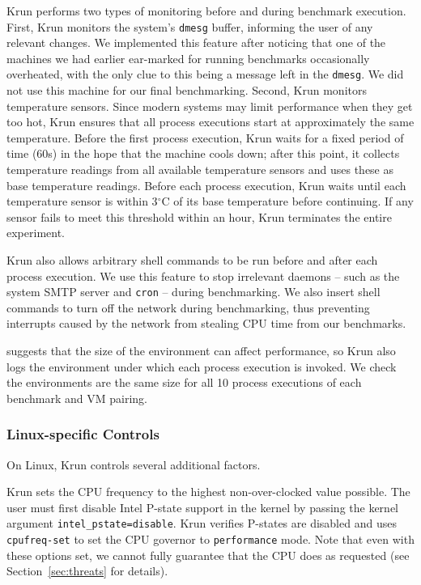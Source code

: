 \documentclass[preprint,numbers,10pt]{sigplanconf}
\newcommand{\krun}{Krun\xspace}
\begin{document}
\krun performs two types of monitoring before and during benchmark execution.
First, \krun monitors the system's \texttt{dmesg} buffer, informing the user of
any relevant changes. We implemented this feature after noticing that one of the
machines we had earlier ear-marked for running benchmarks occasionally
overheated, with the only clue to this being a message left in the \texttt{dmesg}.
We did not use this machine for our final benchmarking.
Second, \krun monitors temperature sensors. Since modern systems may limit
performance when they get too hot, \krun ensures that all process executions
start at approximately the same temperature. Before the first process execution,
\krun waits for a fixed period of time (60s) in the hope that the machine
cools down; after this point, it collects temperature
readings from all available temperature sensors and uses these as
base temperature readings. Before each process execution, \krun
waits until each temperature sensor is within 3$^\circ$C of its base temperature
before continuing. If any sensor fails to meet this threshold
within an hour, \krun terminates the entire experiment.

\krun also allows arbitrary shell commands to be run before and after each
process execution. We use this feature to stop irrelevant daemons -- such as
the system SMTP server and \texttt{cron} -- during benchmarking. We also insert
shell commands to turn off the network during benchmarking, thus preventing
interrupts caused by the network from stealing CPU time from our benchmarks.

 suggests that the size of the environment can affect
performance, so \krun also logs the environment under which each process
execution is invoked. We check the environments are the same size for all 10
process executions of each benchmark and VM pairing.

\subsubsection{Linux-specific Controls}

On Linux, \krun controls several additional factors.

\krun sets the CPU frequency to the highest non-over-clocked value possible.
The user must first disable Intel P-state support in
the kernel by passing the kernel argument \texttt{intel\_pstate=disable}.
\krun verifies P-states are disabled and uses \texttt{cpufreq-set} to set
the CPU governor to \texttt{performance} mode. Note that even with these
options set, we cannot fully guarantee that the CPU does as requested
(see Section~\ref{sec:threats} for details).
\end{document}
